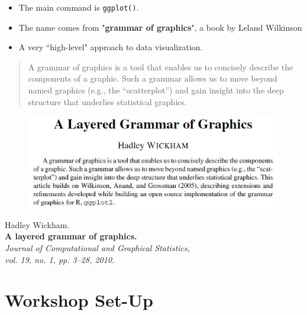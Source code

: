 \documentclass{beamer}
\begin{document}
\begin{frame}[fragile]
\Large
\begin{itemize}
\item The main command is \texttt{ggplot()}.
\item The name comes from "\textbf{grammar of graphics}", a book by Leland Wilkinson
\item A very ``high-level" approach to data visualization.
\end{itemize}
\begin{framed}
\begin{quote}
	A grammar of graphics is a tool that enables us to concisely describe the components
	of a graphic. Such a grammar allows us to move beyond named graphics (e.g., the “scatterplot”)
	and gain insight into the deep structure that underlies statistical graphics.
\end{quote}
\end{framed}
\end{frame}

\begin{frame}

\begin{figure}
\centering
\includegraphics[width=1.1\linewidth]{HWpaper}
\end{figure}
\begin{framed}
Hadley Wickham.\\
\textbf{A layered grammar of graphics.}\\
\textit{Journal of Computational and Graphical Statistics, \\ vol. 19, no. 1, pp. 3–28, 2010.}
\end{framed}

\end{frame}
\section{Workshop Set-Up}
\end{document}
